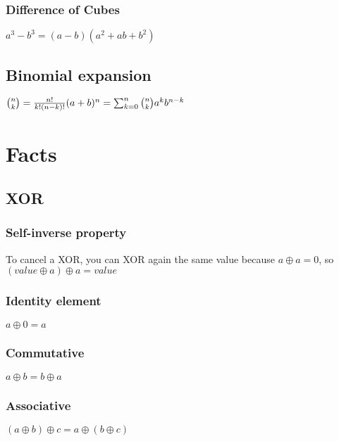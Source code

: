 \documentclass{article}
\begin{document}
\subsubsection{Difference of Cubes}
$a^3-b^3 = (a-b)(a^2 +ab + b^2)$

\subsection{Binomial expansion}
$\binom{n}{k} = \frac{n!}{k!(n-k)!}
\newline
(a+b)^n = \sum_{k=0}^{n} \binom{n}{k}a^{k}b^{n-k}$

\section{Facts}
\subsection{XOR}
\subsubsection{Self-inverse property}
To cancel a XOR, you can XOR again the same value because $a \oplus a = 0$, so $(value \oplus a) \oplus a = value$

\subsubsection{Identity element}
$a \oplus 0 = a$

\subsubsection{Commutative}
$a \oplus b = b \oplus a$

\subsubsection{Associative}
$(a \oplus b) \oplus c = a \oplus (b \oplus c)$
\end{document}
